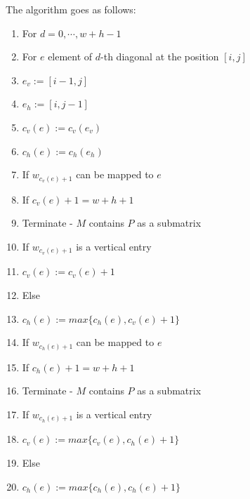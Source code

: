 The algorithm goes as follows:
\begin{enumerate}
\item For $d=0,\cdots,w+h-1$
\item \hspace{5mm} For $e$ element of $d$-th diagonal at the position $[i,j]$
\item \hspace{1cm} $e_v:=[i-1,j]$
\item \hspace{1cm} $e_h:=[i,j-1]$
\item \hspace{1cm} $c_v(e):=c_v(e_v)$
\item \hspace{1cm} $c_h(e):=c_h(e_h)$
\item \hspace{1cm} If $w_{c_v(e)+1}$ can be mapped to $e$
\item \hspace{15mm} If $c_v(e)+1=w+h+1$
\item \hspace{2cm} Terminate - $M$ contains $P$ as a submatrix
\item \hspace{15mm} If $w_{c_v(e)+1}$ is a vertical entry
\item \hspace{2cm} $c_v(e):=c_v(e)+1$
\item \hspace{15mm} Else
\item \hspace{2cm} $c_h(e):=max\{c_h(e),c_v(e)+1\}$
\item \hspace{1cm} If $w_{c_h(e)+1}$ can be mapped to $e$
\item \hspace{15mm} If $c_h(e)+1=w+h+1$
\item \hspace{2cm} Terminate - $M$ contains $P$ as a submatrix
\item \hspace{15mm} If $w_{c_h(e)+1}$ is a vertical entry
\item \hspace{2cm} $c_v(e):=max\{c_v(e),c_h(e)+1\}$
\item \hspace{15mm} Else
\item \hspace{2cm} $c_h(e):=max\{c_h(e),c_h(e)+1\}$
\end{enumerate}

